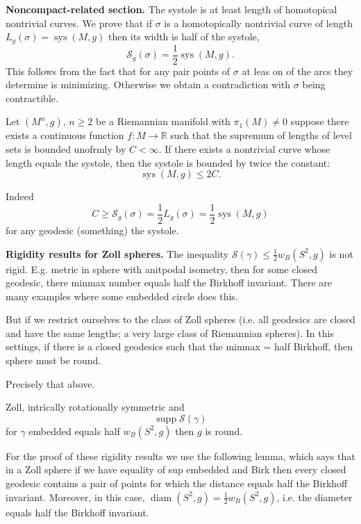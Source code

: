 \medskip\noindent
{\bf Noncompact-related section.}
The systole is at least length of
homotopical nontrivial curves. We prove that
if $\sigma$ is a homotopically nontrivial
curve of length
$L_g(\sigma)=\operatorname{sys}(M,g)$ then
its width is half of the systole,
$$
\mathcal{S}_g(\sigma) =
\frac{1}{2}\operatorname{sys}(M,g).
$$
This follows from the fact that for any pair
points of $\sigma$ at leas on of the arcs
they determine is minimizing. Otherwise we
obtain a contradiction with $\sigma$ being
contractible.

\begin{corollary}[AMM]
\label{lemma-amm7}
Let $(M^n,g)$, $n \geq 2$ be a Riemannian
manifold with $\pi_1(M) \neq 0$ suppose
there exists a continuous function $f :M \to
\mathbb{R}$ such that the supremum of
lengths of level sets is bounded unofrmly by
$C < \infty$. If there exists a nontrivial
curve whose length equals the systole, then
the systole is bounded by twice the
constant:
$$
\operatorname{sys}(M,g) \leq  2 C.
$$
\end{corollary}

\noindent
Indeed
$$
C \geq  \mathcal{S}_g(\sigma)
=
\frac{1}{2}L_g(\sigma)=\frac{1}{2}\operatorname{sys}(M,g)
$$
for any geodesic (something) the systole.

\medskip\noindent
{\bf Rigidity results for Zoll spheres.}
The inequality $\mathcal{S}(\gamma) \leq
\frac{1}{2}w_B(S^2,g)$ is not rigid.
E.g. metric in sphere with anitpodal
isometry, then for some closed geodesic,
there minmax number equals half the Birkhoff
invariant.
There are many examples where some embedded
circle does this.

But if we restrict ourselves to the class of
Zoll spheres (i.e. all geodesics are closed
and have the same lengths; a very large
class of Riemannian spheres).
In this settings, if there is a closed
geodesics such that the minmax = half
Birkhoff, then sphere must be round.

\begin{theorem}[AMM]
\label{theorem-amm8}
Precisely that above.
\end{theorem}

\begin{theorem}[AMM]
\label{theorem-amm9}
Zoll, intrically rotationally symmetric
and
$$
\operatorname{supp} \mathcal{S}(\gamma)
$$
for $\gamma$ embedded equals half
$w_B(S^2,g)$ then $g$ is round.
\end{theorem}

\noindent
For the proof of these rigidity results we
use the following lemma, which says that in
a Zoll sphere if we have equality of sup
embedded and Birk then every closed geodesic
contains a pair of points for which the
distance equals half the Birkhoff invariant.
Moreover, in this case,
$\operatorname{diam}(S^2,g)=\frac{1}{2}w_B(S^2,g)$,
i.e. the diameter equals half the Birkhoff
invariant.

